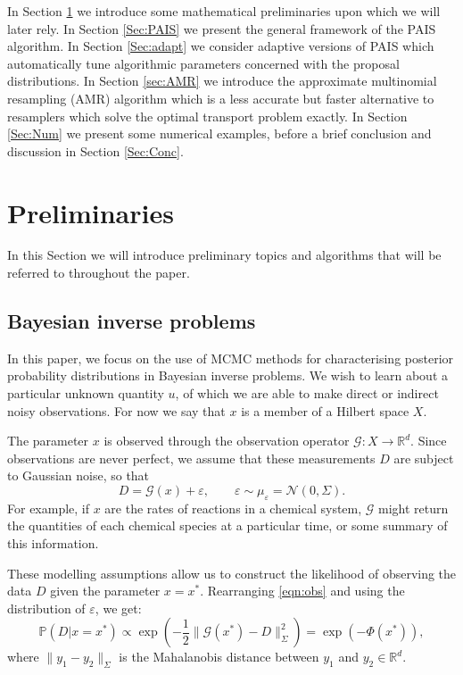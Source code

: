 \documentclass[final]{siamltex}
\newcommand{\G}{\mathcal{G}}
\newcommand{\data}{D}
\begin{document}
In Section \ref{Sec:Prelim} we introduce some mathematical
preliminaries upon which we will later rely. In Section \ref{Sec:PAIS}
we present the general framework of the PAIS algorithm. In Section
\ref{Sec:adapt} we consider adaptive versions of PAIS which
automatically tune algorithmic parameters concerned with the proposal
distributions. In Section \ref{sec:AMR} we introduce the approximate
multinomial resampling (AMR) algorithm which is a less accurate but
faster alternative to resamplers which solve the optimal transport
problem exactly. In Section \ref{Sec:Num} we present some numerical
examples, before a brief conclusion and discussion in Section
\ref{Sec:Conc}.

\section{Preliminaries}\label{Sec:Prelim}
In this Section we will introduce preliminary topics and algorithms
that will be referred to throughout the paper.
\subsection{Bayesian inverse problems}
In this paper, we focus on the use of MCMC methods for characterising
posterior probability distributions in Bayesian inverse problems. We
wish to learn about a particular unknown quantity $u$, of which we are
able to make direct or indirect noisy observations. For now
we say that $x$ is a member of a Hilbert
space $X$. 

The parameter $x$ is observed
through the observation operator $\mathcal{G}:X \to\mathbb{R}^d$. 
Since observations are never perfect, we
assume that these measurements $\data$ are subject to Gaussian noise,
so that
\begin{equation}\label{eqn:obs}
	\data = \mathcal{G}(x) + \varepsilon, \qquad \varepsilon \sim \mu_{\varepsilon} = \mathcal{N}(0,\Sigma).
\end{equation}
For example, if $x$ are the rates of reactions in a chemical system, $\G$ might
return the quantities of each chemical species at a particular time, or some
summary of this information.

These modelling assumptions allow us to construct the 
likelihood of observing the data $\data$ given the parameter $x =
x^*$. Rearranging \eqref{eqn:obs} and using the distribution of
$\varepsilon$, we get:
\begin{equation}\label{eqn:like}
	\mathbb{P}(\data|x=x^*) \propto \exp \left ( -\frac{1}{2} \|\mathcal{G}(x^*)
	  - \data\|_\Sigma^2 \right ) = \exp\left(-\Phi(x^*)\right),
\end{equation}
where $\| y_1 - y_2 \|_\Sigma$ is the Mahalanobis distance between $y_1$ and $y_2 \in \mathbb{R}^d$.
\end{document}
